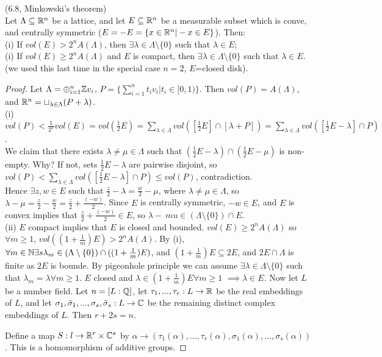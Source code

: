 \documentclass[a4paper]{article}
\begin{document}
\begin{thm} (6.8, Minkowski's theorem)\\
Let $\Lambda \subseteq \mathbb{R}^n$ be a lattice, and let $E \subseteq \mathbb{R}^n$ be a measurable subset which is conve, and centrally symmetric ($E=-E = \{x \in \mathbb{R}^n | -x \in E\}$). Then:\\
(i) If $vol(E) > 2^n A(\Lambda)$, then $\exists \lambda \in \Lambda \setminus \{0\}$ such that $\lambda \in E$;\\
(i) If $vol(E) \geq 2^n A(\Lambda)$ and $E$ is compact, then $\exists \lambda \in \Lambda \setminus \{0\}$ such that $\lambda \in E$.\\
(we used this last time in the special case $n=2$, $E$=closed disk).
\begin{proof}
Let $\Lambda = \oplus_{i=1}^n \mathbb{Z} v_i$, $P = \{\sum_{i=1}^n t_i v_i | t_i \in [0,1)\}$. Then $vol(P) = A(\Lambda)$, and $\mathbb{R}^n = \sqcup_{\lambda \in \Lambda} (P+\lambda)$.\\
(i) $vol(P) < \frac{1}{2^n} vol(E) = vol(\frac{1}{2} E) = \sum_{\lambda \in \Lambda} vol([\frac{1}{2} E] \cap [\lambda+P]) = \sum_{\lambda \in \Lambda} vol ([\frac{1}{2} E - \lambda] \cap P)$.\\
We claim that there exists $\lambda\neq\mu \in \Lambda$ such that $(\frac{1}{2} E - \lambda) \cap (\frac{1}{2} E - \mu)$ is non-empty. Why? If not, sets $\frac{1}{2} E - \lambda$ are pairwise disjoint, so $vol(P) < \sum_{\lambda \in \Lambda} vol([\frac{1}{2} E-\lambda]\cap P) \leq vol(P)$, contradiction.\\
Hence $\exists z,w \in E$ such that $\frac{z}{2} - \lambda = \frac{w}{2} - \mu$, where $\lambda \neq \mu \in \Lambda$, so $\lambda-\mu = \frac{z}{2} - \frac{w}{2} = \frac{z}{2} + \frac{(-w)}{2}$. Since $E$ is centrally symmetric, $-w \in E$, and $E$ is convex implies that $\frac{z}{2} + \frac{(-w)}{2} \in E$, so $\lambda -\ mu \in (\Lambda \setminus \{0\}) \cap E$.\\
(ii) $E$ compact implies that $E$ is closed and bounded. $vol(E) \geq 2^n A(\Lambda)$ so $\forall m \geq 1$, $vol((1+\frac{1}{m}) E) > 2^n A(\Lambda)$. By (i), $\forall m \in \mathbb{N} \exists s\lambda_m \in (\Lambda \setminus \{0\})\cap((1+\frac{1}{m})E)$, and $(1+\frac{1}{m})E \subseteq 2E$, and $2E \cap \Lambda$ is finite as $2E$ is bounde. By pigeonhole principle we can assume $\exists \lambda \in \Lambda \setminus \{0\}$ such that $\lambda_m = \lambda \forall m \geq 1$. $E$ closed and $\lambda \in (1+\frac{1}{m})E \forall m \geq 1$ $\implies \lambda \in E$. Now let $L$ be a number field. Let $n = [L:\mathbb{Q}]$, let $\tau_1,...,\tau_r:L \to \mathbb{R}$ be the real embeddings of $L$, and let $\sigma_1,\bar{\sigma}_1,...,\sigma_s,\bar{\sigma}_s:L \to \mathbb{C}$ be the remaining distinct complex embeddings of $L$. Then $r+2s = n$.

Define a map $S:l \to \mathbb{R}^r \times \mathbb{C}^s$ by $\alpha \to (\tau_1(\alpha),...,\tau_r(\alpha),\sigma_1(\alpha),...,\sigma_s(\alpha))$. This is a homomorphism of additive groups.
\end{proof}
\end{thm}
\end{document}
